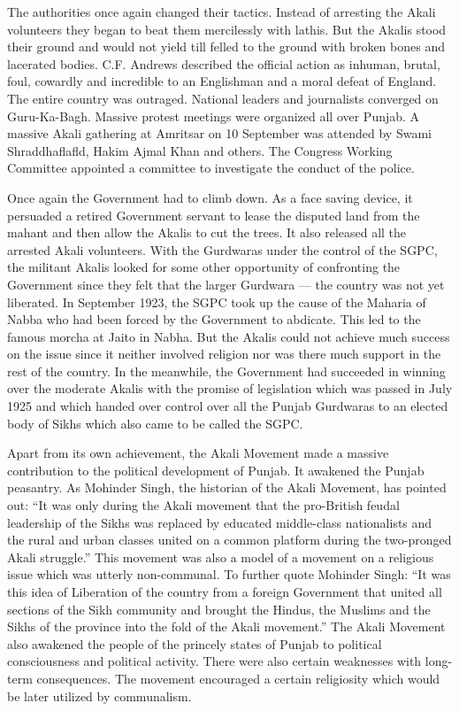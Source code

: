 \begin{multicols}{2}
The authorities once again changed their tactics. Instead of arresting the Akali volunteers they began to beat them mercilessly with lathis. But the Akalis stood their ground and would not yield till felled to the ground with broken bones and lacerated bodies. C.F. Andrews described the official action as inhuman, brutal, foul, cowardly and incredible to an Englishman and a moral defeat of England. The entire country was outraged. National leaders and journalists converged on Guru-Ka-Bagh. Massive protest meetings were organized all over Punjab. A massive Akali gathering at Amritsar on 10 September was attended by Swami Shraddhaflafld, Hakim Ajmal Khan and others. The Congress Working Committee appointed a committee to investigate the conduct of the police.

Once again the Government had to climb down. As a face saving device, it persuaded a retired Government servant to lease the disputed land from the mahant and then allow the Akalis to cut the trees. It also released all the arrested Akali volunteers. With the Gurdwaras under the control of the SGPC, the militant Akalis looked for some other opportunity of confronting the Government since they felt that the larger Gurdwara --- the country was not yet liberated. In September 1923, the SGPC took up the cause of the Maharia of Nabba who had been forced by the Government to abdicate. This led to the famous morcha at Jaito in Nabha. But the Akalis could not achieve much success on the issue since it neither involved religion nor was there much support in the rest of the country. In the meanwhile, the Government had succeeded in winning over the moderate Akalis with the promise of legislation which was passed in July 1925 and which handed over control over all the Punjab Gurdwaras to an elected body of Sikhs which also came to be called the SGPC.

Apart from its own achievement, the Akali Movement made a massive contribution to the political development of Punjab. It awakened the Punjab peasantry. As Mohinder Singh, the historian of the Akali Movement, has pointed out: ``It was only during the Akali movement that the pro-British feudal leadership of the Sikhs was replaced by educated middle-class nationalists and the rural and urban classes united on a common platform during the two-pronged Akali struggle.'' This movement was also a model of a movement on a religious issue which was utterly non-communal. To further quote Mohinder Singh: ``It was this idea of Liberation of the country from a foreign Government that united all sections of the Sikh community and brought the Hindus, the Muslims and the Sikhs of the province into the fold of the Akali movement.'' The Akali Movement also awakened the people of the princely states of Punjab to political consciousness and political activity. There were also certain weaknesses with long-term consequences. The movement encouraged a certain religiosity which would be later utilized by communalism.


\end{multicols}
